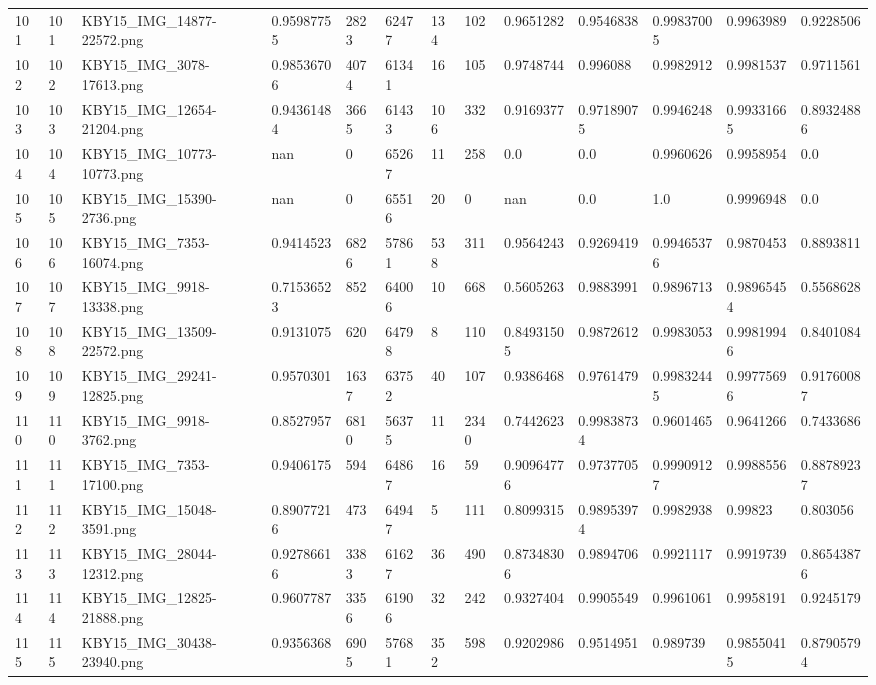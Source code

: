 \documentclass[11pt, a4paper, twoside]{report}
\begin{document}
\begin{longtable}[c]{@{}lllllllllllll@{}}
101 & 101 & KBY15\_IMG\_14877-22572.png & 0.95987755 & 2823 & 62477 & 134 & 102 & 0.9651282 & 0.9546838 & 0.99837005 & 0.9963989 & 0.9228506 \\
102 & 102 & KBY15\_IMG\_3078-17613.png & 0.98536706 & 4074 & 61341 & 16 & 105 & 0.9748744 & 0.996088 & 0.9982912 & 0.9981537 & 0.9711561 \\
103 & 103 & KBY15\_IMG\_12654-21204.png & 0.94361484 & 3665 & 61433 & 106 & 332 & 0.9169377 & 0.97189075 & 0.9946248 & 0.99331665 & 0.89324886 \\
104 & 104 & KBY15\_IMG\_10773-10773.png & nan & 0 & 65267 & 11 & 258 & 0.0 & 0.0 & 0.9960626 & 0.9958954 & 0.0 \\
105 & 105 & KBY15\_IMG\_15390-2736.png & nan & 0 & 65516 & 20 & 0 & nan & 0.0 & 1.0 & 0.9996948 & 0.0 \\
106 & 106 & KBY15\_IMG\_7353-16074.png & 0.9414523 & 6826 & 57861 & 538 & 311 & 0.9564243 & 0.9269419 & 0.99465376 & 0.9870453 & 0.8893811 \\
107 & 107 & KBY15\_IMG\_9918-13338.png & 0.71536523 & 852 & 64006 & 10 & 668 & 0.5605263 & 0.9883991 & 0.9896713 & 0.98965454 & 0.5568628 \\
108 & 108 & KBY15\_IMG\_13509-22572.png & 0.9131075 & 620 & 64798 & 8 & 110 & 0.84931505 & 0.9872612 & 0.9983053 & 0.99819946 & 0.8401084 \\
109 & 109 & KBY15\_IMG\_29241-12825.png & 0.9570301 & 1637 & 63752 & 40 & 107 & 0.9386468 & 0.9761479 & 0.99832445 & 0.99775696 & 0.91760087 \\
110 & 110 & KBY15\_IMG\_9918-3762.png & 0.8527957 & 6810 & 56375 & 11 & 2340 & 0.7442623 & 0.99838734 & 0.9601465 & 0.9641266 & 0.7433686 \\
111 & 111 & KBY15\_IMG\_7353-17100.png & 0.9406175 & 594 & 64867 & 16 & 59 & 0.90964776 & 0.9737705 & 0.99909127 & 0.9988556 & 0.88789237 \\
112 & 112 & KBY15\_IMG\_15048-3591.png & 0.89077216 & 473 & 64947 & 5 & 111 & 0.8099315 & 0.98953974 & 0.9982938 & 0.99823 & 0.803056 \\
113 & 113 & KBY15\_IMG\_28044-12312.png & 0.92786616 & 3383 & 61627 & 36 & 490 & 0.87348306 & 0.9894706 & 0.9921117 & 0.9919739 & 0.86543876 \\
114 & 114 & KBY15\_IMG\_12825-21888.png & 0.9607787 & 3356 & 61906 & 32 & 242 & 0.9327404 & 0.9905549 & 0.9961061 & 0.9958191 & 0.9245179 \\
115 & 115 & KBY15\_IMG\_30438-23940.png & 0.9356368 & 6905 & 57681 & 352 & 598 & 0.9202986 & 0.9514951 & 0.989739 & 0.98550415 & 0.87905794 \\

\end{longtable}
\end{document}
